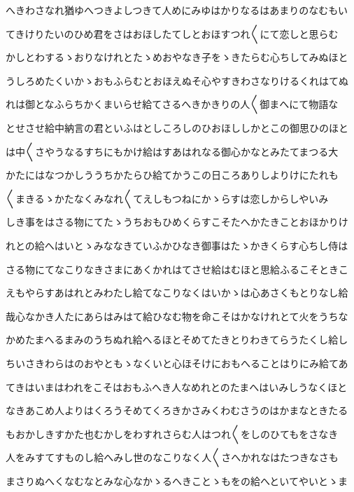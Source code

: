 \documentclass[a4paper,11pt,landscape]{ltjtarticle}
\begin{document}
\par\medskip
へきわさなれ猶ゆへつきよしつきて人めにみゆはかりなるはあまりのなむもい
\par\medskip
てきけりたいのひめ君をさはおほしたてしとおほすつれ〱にて恋しと思らむ
\par\medskip
かしとわするゝおりなけれとたゝめおやなき子をゝきたらむ心ちしてみぬほと
\par\medskip
うしろめたくいかゝおもふらむとおほえぬそ心やすきわさなりけるくれはてぬ
\par\medskip
れは御となふらちかくまいらせ給てさるへきかきりの人〱御まへにて物語な
\par\medskip
とせさせ給中納言の君といふはとしころしのひおほししかとこの御思ひのほと
\par\medskip
は中〱さやうなるすちにもかけ給はすあはれなる御心かなとみたてまつる大
\par\medskip
かたにはなつかしううちかたらひ給てかうこの日ころありしよりけにたれも
\par\medskip
〱まきるゝかたなくみなれ〱てえしもつねにかゝらすは恋しからしやいみ
\par\medskip
しき事をはさる物にてたゝうちおもひめくらすこそたへかたきことおほかりけ
\par\medskip
れとの給へはいとゝみななきていふかひなき御事はたゝかきくらす心ちし侍は
\par\medskip
さる物にてなこりなきさまにあくかれはてさせ給はむほと思給ふるこそときこ
\par\medskip
えもやらすあはれとみわたし給てなこりなくはいかゝは心あさくもとりなし給
\par\medskip
哉心なかき人たにあらはみはて給ひなむ物を命こそはかなけれとて火をうちな
\par\medskip
かめたまへるまみのうちぬれ給へるほとそめてたきとりわきてらうたくし給し
\par\medskip
ちいさきわらはのおやともゝなくいと心ほそけにおもへることはりにみ給てあ
\par\medskip
てきはいまはわれをこそはおもふへき人なめれとのたまへはいみしうなくほと
\par\medskip
なきあこめ人よりはくろうそめてくろきかさみくわむさうのはかまなときたる
\par\medskip
もおかしきすかた也むかしをわすれさらむ人はつれ〱をしのひてもをさなき
\par\medskip
人をみすてすものし給へみし世のなこりなく人〱さへかれなはたつきなさも
\par\medskip
まさりぬへくなむなとみな心なかゝるへきことゝもをの給へといてやいとゝま
\par\medskip
\end{document}
